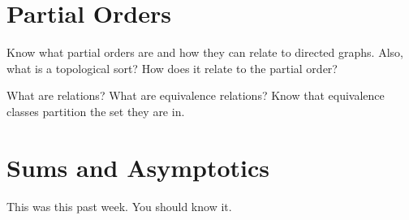 \documentclass[11pt]{article}
\begin{document}
\section{Partial Orders}

Know what partial orders are and how they can relate to directed graphs.  Also, what is a
topological sort?  How does it relate to the partial order?

What are relations?  What are equivalence relations?  Know that equivalence classes partition the set they are in.

\section{Sums and Asymptotics}
This was this past week.  You should know it.  
\end{document}
